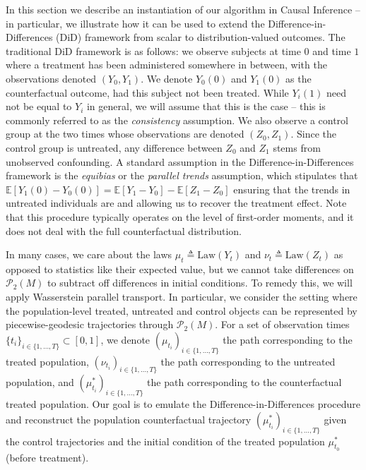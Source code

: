 \documentclass[11pt]{article}
\newcommand{\man}{M}
\begin{document}
In this section we describe an instantiation of our algorithm in Causal Inference -- in particular, we illustrate how it can be used to extend the Difference-in-Differences (DiD) framework from scalar to distribution-valued outcomes. The traditional DiD framework is as follows: we observe subjects at time $0$ and time $1$ where a treatment has been administered somewhere in between, with the observations denoted $(Y_0, Y_1)$. We denote $Y_0(0)$ and $Y_1(0)$ as the counterfactual outcome, had this subject not been treated. While $Y_i(1)$ need not be equal to $Y_i$ in general, we will assume that this is the case -- this is commonly referred to as the \textit{consistency} assumption. We also observe a control group at the two times whose observations are denoted $(Z_0, Z_1).$ Since the control group is untreated, any difference between $Z_0$ and $Z_1$ stems from unobserved confounding. A standard assumption in the Difference-in-Differences framework is the \textit{equibias} or the \textit{parallel trends} assumption, which stipulates that $\mathbb{E}[Y_1(0) - Y_0(0)] = \mathbb{E}[Y_1 - Y_0] - \mathbb{E}[Z_1 - Z_0]$ ensuring that the trends in untreated individuals are  \citep{abadie2005semiparametric} and allowing us to recover the treatment effect. Note that this procedure typically operates on the level of first-order moments, and it does not deal with the full counterfactual distribution. 



In many cases, we care about the laws $\mu_t \triangleq \text{Law}(Y_t)$ and $\nu_t \triangleq \text{Law}(Z_t)$ as opposed to statistics like their expected value, but we cannot take differences on $\mathcal{P}_2(\man)$ to subtract off differences in initial conditions.  To remedy this, we will apply Wasserstein parallel transport. In particular, we consider the setting where the population-level treated, untreated and control objects can be represented by piecewise-geodesic trajectories through $\mathcal{P}_2(\man)$. For a set of observation times $\{t_i\}_{i \in \{1, \dots, T\}} \subset [0, 1]$, we denote $(\mu_{t_i})_{i \in \{1, \dots, T\}}$ the path corresponding to the treated population, $(\nu_{t_i})_{i \in \{1, \dots, T\}}$ the path corresponding to the untreated population, and $(\mu_{t_i}^*)_{i \in \{1, \dots, T\}}$ the path corresponding to the counterfactual treated population. Our goal is to emulate the Difference-in-Differences procedure and reconstruct the population counterfactual trajectory $(\mu_{t_i}^*)_{i \in \{1, \dots, T\}}$ given the control trajectories and the initial condition of the treated population $\mu_{t_0}^*$ (before treatment). 
\end{document}
